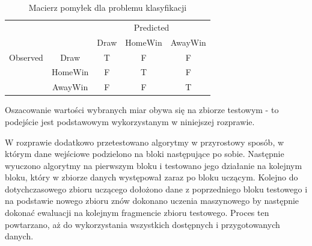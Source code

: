 \begin{center}
\begin{table}[H]
\renewcommand{\arraystretch}{1.5}
\caption{Macierz pomyłek dla problemu klasyfikacji}
\label{tab:macierz}
\begin{center}
\begin{tabular}{|c|c|c|c|c|}
   \cline{3-5} 
   \multicolumn{1}{c}{} & & \multicolumn{3}{c|}{Predicted} \\ \cline{3-5}
   \multicolumn{1}{c}{} & & Draw & HomeWin & AwayWin \\ \hline
   
   {Observed}
   & Draw & T & F & F \\ \cline{2-5}
   & HomeWin & F & T & F  \\ \cline{2-5}
   & AwayWin & F & F & T \\ \hline
\end{tabular}
\end{center}
\end{table}
\end{center}

Oszacowanie wartości wybranych miar obywa się na zbiorze testowym - to podejście jest podstawowym wykorzystanym w niniejszej rozprawie.

W rozprawie dodatkowo przetestowano algorytmy w przyrostowy sposób, w którym dane wejściowe podzielono na bloki następujące po sobie. Następnie wyuczono algorytmy na pierwszym bloku i testowano jego działanie na kolejnym bloku, który w zbiorze danych występował zaraz po bloku uczącym. Kolejno do dotychczasowego zbioru uczącego dołożono dane z poprzedniego bloku testowego i na podstawie nowego zbioru znów dokonano uczenia maszynowego by następnie dokonać ewaluacji na kolejnym fragmencie zbioru testowego. Proces ten powtarzano, aż do wykorzystania wszystkich dostępnych i przygotowanych danych.

\newpage\null\thispagestyle{empty}\newpage
